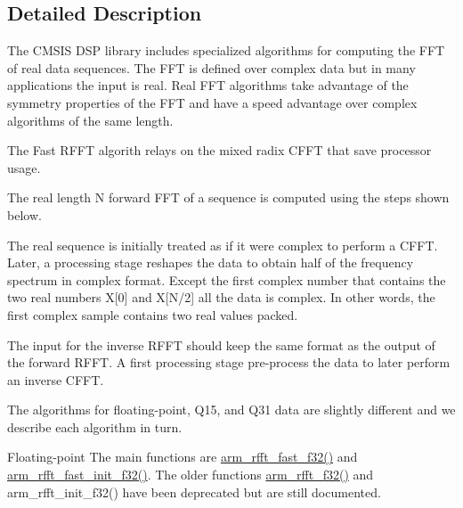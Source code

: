 \subsection{Detailed Description}
\begin{DoxyParagraph}{}
The C\+M\+S\+IS D\+SP library includes specialized algorithms for computing the F\+FT of real data sequences. The F\+FT is defined over complex data but in many applications the input is real. Real F\+FT algorithms take advantage of the symmetry properties of the F\+FT and have a speed advantage over complex algorithms of the same length. 
\end{DoxyParagraph}
\begin{DoxyParagraph}{}
The Fast R\+F\+FT algorith relays on the mixed radix C\+F\+FT that save processor usage. 
\end{DoxyParagraph}
\begin{DoxyParagraph}{}
The real length N forward F\+FT of a sequence is computed using the steps shown below. 
\end{DoxyParagraph}
\begin{DoxyParagraph}{}
 
\end{DoxyParagraph}
\begin{DoxyParagraph}{}
The real sequence is initially treated as if it were complex to perform a C\+F\+FT. Later, a processing stage reshapes the data to obtain half of the frequency spectrum in complex format. Except the first complex number that contains the two real numbers X\mbox{[}0\mbox{]} and X\mbox{[}N/2\mbox{]} all the data is complex. In other words, the first complex sample contains two real values packed. 
\end{DoxyParagraph}
\begin{DoxyParagraph}{}
The input for the inverse R\+F\+FT should keep the same format as the output of the forward R\+F\+FT. A first processing stage pre-\/process the data to later perform an inverse C\+F\+FT. 
\end{DoxyParagraph}
\begin{DoxyParagraph}{}
 
\end{DoxyParagraph}
\begin{DoxyParagraph}{}
The algorithms for floating-\/point, Q15, and Q31 data are slightly different and we describe each algorithm in turn. 
\end{DoxyParagraph}
\begin{DoxyParagraph}{Floating-\/point}
The main functions are \hyperlink{group__RealFFT_ga180d8b764d59cbb85d37a2d5f7cd9799}{arm\+\_\+rfft\+\_\+fast\+\_\+f32()} and \hyperlink{group__RealFFT_gac5fceb172551e7c11eb4d0e17ef15aa3}{arm\+\_\+rfft\+\_\+fast\+\_\+init\+\_\+f32()}. The older functions \hyperlink{group__RealFFT_ga3df1766d230532bc068fc4ed69d0fcdc}{arm\+\_\+rfft\+\_\+f32()} and arm\+\_\+rfft\+\_\+init\+\_\+f32() have been deprecated but are still documented. 
\end{DoxyParagraph}
